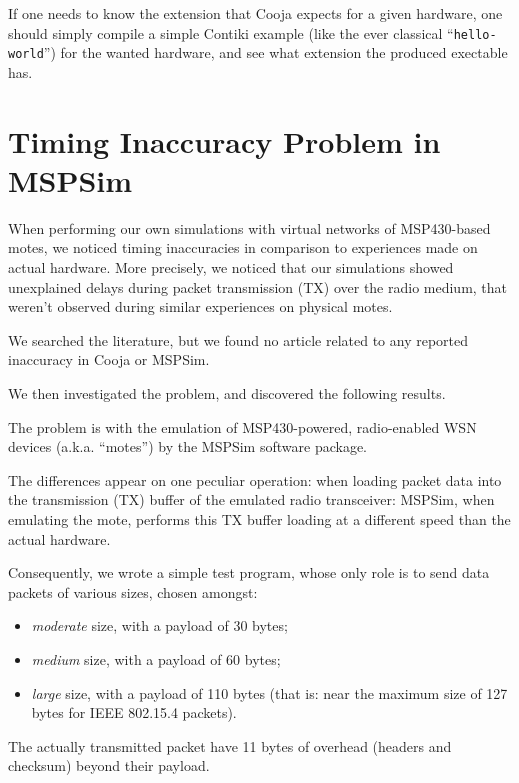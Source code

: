 \documentclass[10pt,emptycopyrightspace]{ewsn-proc}
\begin{document}
If one needs to know the extension that Cooja expects for a given hardware,
one should simply compile a simple Contiki example (like the ever classical
``\texttt{hello-world}'')  for the wanted hardware, and see what extension
the produced exectable has.

\bigskip


\section{Timing Inaccuracy Problem in MSPSim}
\label{results}

When performing our own simulations with virtual networks of MSP430-based
motes, we noticed timing inaccuracies in comparison to experiences made
on actual hardware. More precisely, we noticed that our simulations showed
unexplained delays during packet transmission (TX) over the radio medium,
that weren't observed during similar experiences on physical motes.

We searched the literature, but we found no article related to any reported
inaccuracy in Cooja or MSPSim.

We then investigated the problem, and discovered the following results.

The problem is with the emulation of MSP430-powered, radio-enabled WSN
devices (a.k.a. ``motes'') by the MSPSim software package.

The differences appear on one peculiar operation: when loading packet data
into the transmission (TX) buffer of the emulated radio transceiver:
MSPSim, when emulating the mote, performs this TX buffer loading at
a different speed than the actual hardware.

Consequently, we wrote a simple test program, whose only role is to send
data packets of various sizes, chosen amongst:
\begin{itemize}
\item \emph{moderate} size, with a payload of 30 bytes;
\item \emph{medium} size, with a payload of 60 bytes;
\item \emph{large} size, with a payload of 110 bytes (that is:
      near the maximum size of 127 bytes for IEEE 802.15.4 packets).
\end{itemize}
\smallskip
The actually transmitted packet have 11 bytes of overhead (headers and
checksum) beyond their payload.
\end{document}
